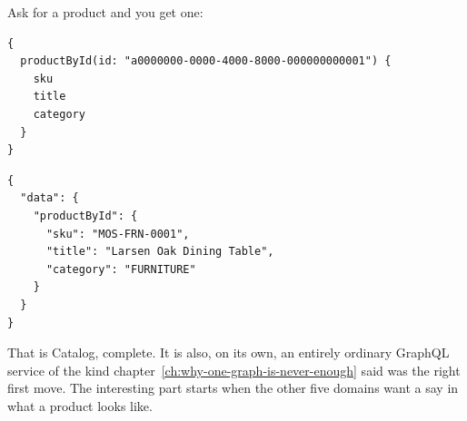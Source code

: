 Ask for a product and you get one:

\begin{verbatim}
{
  productById(id: "a0000000-0000-4000-8000-000000000001") {
    sku
    title
    category
  }
}
\end{verbatim}

\begin{verbatim}
{
  "data": {
    "productById": {
      "sku": "MOS-FRN-0001",
      "title": "Larsen Oak Dining Table",
      "category": "FURNITURE"
    }
  }
}
\end{verbatim}

That is Catalog, complete. It is also, on its own, an entirely ordinary GraphQL
service of the kind chapter~\ref{ch:why-one-graph-is-never-enough} said was the
right first move. The interesting part starts when the other five domains want a
say in what a product looks like.
